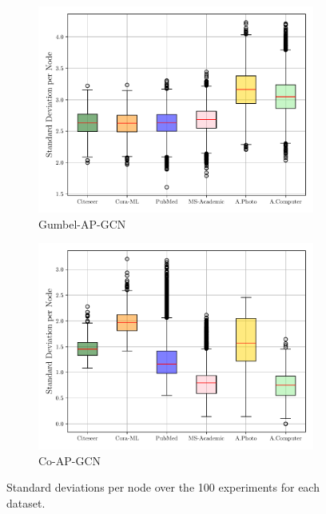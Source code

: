 \documentclass{gdl}
\begin{document}
\begin{figure}[p]
\begin{minipage}[t]{0.48\textwidth}
        \begin{subfigure}[b]{0.7\textwidth}
            \centering
            \includegraphics[width=\textwidth]{Gumbel-AP-GCN_std_steps_per_node_boxplot.pdf}
            \captionsetup{justification=centerlast}
            \caption{Gumbel-AP-GCN}
            \label{fig:step_std_Gumbel_AP_GCN}
        \end{subfigure}
        
        \begin{subfigure}[b]{0.7\textwidth}
            \centering
            \includegraphics[width=\textwidth]{Spinelli_std_steps_per_node_boxplot.pdf}
            \captionsetup{justification=centerlast}
            \caption{Co-AP-GCN}
            \label{fig:step_std_Co_AP_GCN}
        \end{subfigure}
        
        \captionsetup{justification=centerlast}
        \caption{Standard deviations per node over the 100 experiments for each dataset.}
        \label{fig:steps_dist_steps_std}
    \end{minipage}
\end{figure}
\end{document}
